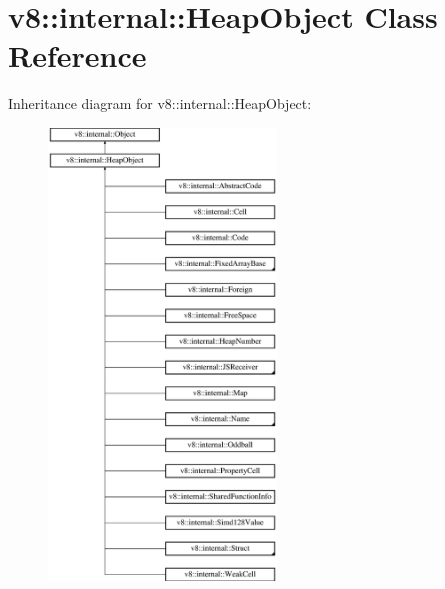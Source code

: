 \hypertarget{classv8_1_1internal_1_1_heap_object}{}\section{v8\+:\+:internal\+:\+:Heap\+Object Class Reference}
\label{classv8_1_1internal_1_1_heap_object}
Inheritance diagram for v8\+:\+:internal\+:\+:Heap\+Object\+:\begin{figure}[H]
\begin{center}
\leavevmode
\includegraphics[height=12.000000cm]{classv8_1_1internal_1_1_heap_object}
\end{center}
\end{figure}
